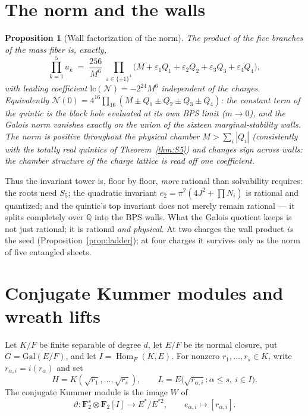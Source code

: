 \documentclass[11pt]{article}
\newtheorem{proposition}[theorem]{Proposition}
\theoremstyle{definition}
\theoremstyle{remark}
\newcommand{\Q}{\mathbb{Q}}
\newcommand{\Gal}{\mathrm{Gal}}
\begin{document}
\section{The norm and the walls}
\label{sec:walls}

\begin{proposition}[Wall factorization of the norm]
\label{prop:walls}
The product of the five branches of the mass fiber is, exactly,
\begin{equation}
\prod_{k=1}^{5}u_k \;=\;
\frac{256}{M^{6}}\;
\prod_{\varepsilon\in\{\pm1\}^4}\bigl(M+\varepsilon_1Q_1+\varepsilon_2Q_2
+\varepsilon_3Q_3+\varepsilon_4Q_4\bigr),
\end{equation}
with leading coefficient $\mathrm{lc}(\mathcal N)=-2^{24}M^6$ independent of
the charges. Equivalently $\mathcal N(0)=4^{16}\prod_{16}(M\pm Q_1\pm Q_2\pm
Q_3\pm Q_4)$: the constant term of the quintic is the black hole evaluated at
its own BPS limit ($m\to0$), and the Galois norm vanishes exactly on the union
of the sixteen marginal-stability walls. The norm is positive throughout the
physical chamber $M>\sum_i|Q_i|$ (consistently with the totally real quintics
of Theorem~\ref{thm:S5}) and changes sign across walls: the chamber structure
of the charge lattice is read off one coefficient.
\end{proposition}

Thus the invariant tower is, floor by floor, \emph{more} rational than
solvability requires: the roots need $S_5$; the quadratic invariant
$e_2=\pi^2(4J^2+\prod N_i)$ is rational and quantized; and the quintic's top
invariant does not merely remain rational --- it splits completely over $\Q$
into the BPS walls. What the Galois quotient keeps is not just rational; it is
rational \emph{and physical}. At two charges the wall product \emph{is} the
seed (Proposition~\ref{prop:ladder}); at four charges it survives only as the
norm of five entangled sheets.

\section{Conjugate Kummer modules and wreath lifts}
\label{sec:kummer}

Let $K/F$ be finite separable of degree $d$, let $E/F$ be its normal closure,
put $G=\Gal(E/F)$, and let $I=\operatorname{Hom}_F(K,E)$.  For nonzero
$r_1,\ldots,r_s\in K$, write $r_{\alpha,i}=i(r_\alpha)$ and set
\begin{equation}
H=K(\sqrt{r_1},\ldots,\sqrt{r_s}),\qquad
L=E\bigl(\sqrt{r_{\alpha,i}}:\alpha\le s,\ i\in I\bigr).
\end{equation}
The conjugate Kummer module is the image $W$ of
\begin{equation}
\vartheta:\mathbf F_2^s\otimes\mathbf F_2[I]\longrightarrow E^*/E^{*2},
\qquad e_{\alpha,i}\longmapsto[r_{\alpha,i}].
\label{eq:kummermap}
\end{equation}
\end{document}
